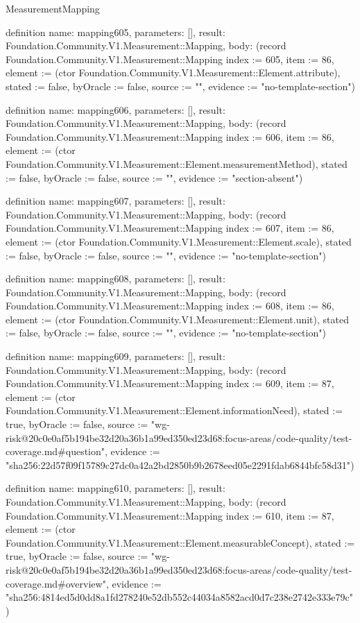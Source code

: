 \begin{lexlean}{MeasurementMapping}
\begin{semanticmodule}
definition{
  name: mapping605,
  parameters: [],
  result: Foundation.Community.V1.Measurement::Mapping,
  body: (record Foundation.Community.V1.Measurement::Mapping {index := 605, item := 86, element := (ctor Foundation.Community.V1.Measurement::Element.attribute), stated := false, byOracle := false, source := "", evidence := "no-template-section"})
}

definition{
  name: mapping606,
  parameters: [],
  result: Foundation.Community.V1.Measurement::Mapping,
  body: (record Foundation.Community.V1.Measurement::Mapping {index := 606, item := 86, element := (ctor Foundation.Community.V1.Measurement::Element.measurementMethod), stated := false, byOracle := false, source := "", evidence := "section-absent"})
}

definition{
  name: mapping607,
  parameters: [],
  result: Foundation.Community.V1.Measurement::Mapping,
  body: (record Foundation.Community.V1.Measurement::Mapping {index := 607, item := 86, element := (ctor Foundation.Community.V1.Measurement::Element.scale), stated := false, byOracle := false, source := "", evidence := "no-template-section"})
}

definition{
  name: mapping608,
  parameters: [],
  result: Foundation.Community.V1.Measurement::Mapping,
  body: (record Foundation.Community.V1.Measurement::Mapping {index := 608, item := 86, element := (ctor Foundation.Community.V1.Measurement::Element.unit), stated := false, byOracle := false, source := "", evidence := "no-template-section"})
}

definition{
  name: mapping609,
  parameters: [],
  result: Foundation.Community.V1.Measurement::Mapping,
  body: (record Foundation.Community.V1.Measurement::Mapping {index := 609, item := 87, element := (ctor Foundation.Community.V1.Measurement::Element.informationNeed), stated := true, byOracle := false, source := "wg-risk@20c0e0af5b194be32d20a36b1a99ed350ed23d68:focus-areas/code-quality/test-coverage.md#question", evidence := "sha256:22d57f09f15789c27dc0a42a2bd2850b9b2678eed05e2291fdab6844bfc58d31"})
}

definition{
  name: mapping610,
  parameters: [],
  result: Foundation.Community.V1.Measurement::Mapping,
  body: (record Foundation.Community.V1.Measurement::Mapping {index := 610, item := 87, element := (ctor Foundation.Community.V1.Measurement::Element.measurableConcept), stated := true, byOracle := false, source := "wg-risk@20c0e0af5b194be32d20a36b1a99ed350ed23d68:focus-areas/code-quality/test-coverage.md#overview", evidence := "sha256:4814ed5d0dd8a1fd278240e52db552c44034a8582acd0d7c238e2742e333e79c"})
}


\end{semanticmodule}
\end{lexlean}
